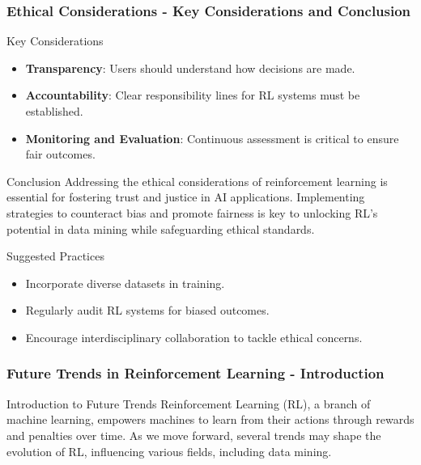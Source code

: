 \documentclass[aspectratio=169]{beamer}
\begin{document}
\begin{frame}[fragile]
    \frametitle{Ethical Considerations - Key Considerations and Conclusion}
    \begin{block}{Key Considerations}
        \begin{itemize}
            \item \textbf{Transparency}: Users should understand how decisions are made.
            \item \textbf{Accountability}: Clear responsibility lines for RL systems must be established.
            \item \textbf{Monitoring and Evaluation}: Continuous assessment is critical to ensure fair outcomes.
        \end{itemize}
    \end{block}
    
    \begin{block}{Conclusion}
        Addressing the ethical considerations of reinforcement learning is essential for fostering trust and justice in AI applications. 
        Implementing strategies to counteract bias and promote fairness is key to unlocking RL's potential in data mining while safeguarding ethical standards.
    \end{block}

    \begin{block}{Suggested Practices}
        \begin{itemize}
            \item Incorporate diverse datasets in training.
            \item Regularly audit RL systems for biased outcomes.
            \item Encourage interdisciplinary collaboration to tackle ethical concerns.
        \end{itemize}
    \end{block}
\end{frame}

\begin{frame}[fragile]
    \frametitle{Future Trends in Reinforcement Learning - Introduction}
    \begin{block}{Introduction to Future Trends}
        Reinforcement Learning (RL), a branch of machine learning, empowers machines to learn from their actions through rewards and penalties over time. As we move forward, several trends may shape the evolution of RL, influencing various fields, including data mining.
    \end{block}
\end{frame}
\end{document}
